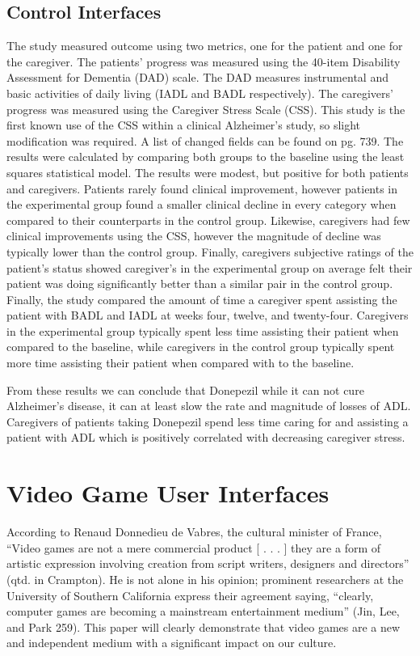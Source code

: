 \subsection{Control Interfaces}
The study measured outcome using two metrics, one for the patient and one for the caregiver.  The patients’ progress was measured using the 40-item Disability Assessment for Dementia (DAD) scale.  The DAD measures instrumental and basic activities of daily living (IADL and BADL respectively).  The caregivers’ progress was measured using the Caregiver Stress Scale (CSS).  This study is the first known use of the CSS within a clinical Alzheimer’s study, so slight modification was required.  A list of changed fields can be found on pg. 739.  The results were calculated by comparing both groups to the baseline using the least squares statistical model.  The results were modest, but positive for both patients and caregivers.  Patients rarely found clinical improvement, however patients in the experimental group found a smaller clinical decline in every category when compared to their counterparts in the control group.  Likewise, caregivers had few clinical improvements using the CSS, however the magnitude of decline was typically lower than the control group.  Finally, caregivers subjective ratings of the patient’s status showed caregiver’s in the experimental group on average felt their patient was doing significantly better than a similar pair in the control group. Finally, the study compared the amount of time a caregiver spent assisting the patient with BADL and IADL at weeks four, twelve, and twenty-four.  Caregivers in the experimental group typically spent less time assisting their patient when compared to the baseline, while caregivers in the control group typically spent more time assisting their patient when compared with to the baseline.


From these results we can conclude that Donepezil while it can not cure Alzheimer’s disease, it can at least slow the rate and magnitude of losses of ADL.  Caregivers of patients taking Donepezil spend less time caring for and assisting a patient with ADL which is positively correlated with decreasing caregiver stress.


\section{Video Game User Interfaces}
According to Renaud Donnedieu de Vabres, the cultural minister of France, “Video games are not a mere commercial product [ . . . ] they are a form of artistic expression involving creation from script writers, designers and directors” (qtd. in Crampton).  He is not alone in his opinion; prominent researchers at the University of Southern California express their agreement saying, “clearly, computer games are becoming a mainstream entertainment medium” (Jin, Lee, and Park 259).  This paper will clearly demonstrate that video games are a new and independent medium with a significant impact on our culture.	

